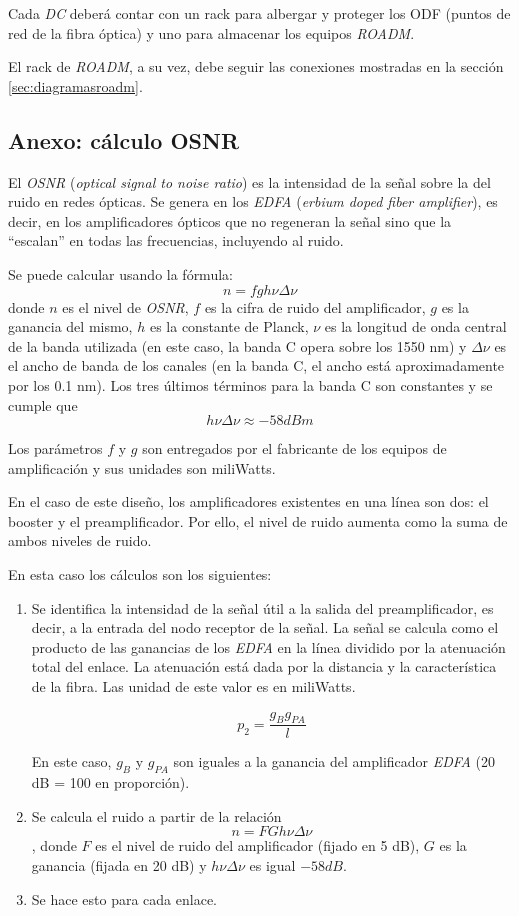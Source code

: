 Cada \emph{DC} deberá contar con un rack para albergar y proteger los
ODF (puntos de red de la fibra óptica) y uno para almacenar los
equipos \emph{ROADM}.

El rack de \emph{ROADM}, a su vez, debe seguir las conexiones
mostradas en la sección \ref{sec:diagramasroadm}.

\subsection{Anexo: cálculo OSNR}
\label{sec:osnr}

El \emph{OSNR} (\emph{optical signal to noise ratio}) es la intensidad
de la señal sobre la del ruido en redes ópticas. Se genera en los
\emph{EDFA} (\emph{erbium doped fiber amplifier}), es decir, en los
amplificadores ópticos que no regeneran la señal sino que la
``escalan'' en todas las frecuencias, incluyendo al ruido.

Se puede calcular usando la fórmula: $$n = fgh \nu \Delta \nu$$ donde
$n$ es el nivel de \emph{OSNR}, $f$ es la cifra de ruido del
amplificador, $g$ es la ganancia del mismo, $h$ es la constante de
Planck, $\nu$ es la longitud de onda central de la banda utilizada (en
este caso, la banda C opera sobre los 1550 nm) y $\Delta \nu$ es el
ancho de banda de los canales (en la banda C, el ancho está
aproximadamente por los 0.1 nm). Los tres últimos términos para la
banda C son constantes y se cumple que $$h\nu \Delta \nu \approx -58
dBm$$

Los parámetros $f$ y $g$ son entregados por el fabricante de los
equipos de amplificación y sus unidades son miliWatts.

En el caso de este diseño, los amplificadores existentes en una línea
son dos: el booster y el preamplificador. Por ello, el nivel de ruido
aumenta como la suma de ambos niveles de ruido.

En esta caso los cálculos son los siguientes:
\begin{enumerate}
\item Se identifica la intensidad de la señal útil a la salida del
  preamplificador, es decir, a la entrada del nodo receptor de la
  señal. La señal se calcula como el producto de las ganancias de los
  \emph{EDFA} en la línea dividido por la atenuación total del
  enlace. La atenuación está dada por la distancia y la característica
  de la fibra. Las unidad de este valor es en miliWatts.

  $$p_2=\frac{g_Bg_{PA}}{l}$$

  En este caso, $g_B$ y $g_{PA}$ son iguales a la ganancia del
  amplificador \emph{EDFA} (20 dB = 100 en proporción).
\item Se calcula el ruido a partir de la relación $$n=FGh \nu \Delta
  \nu$$, donde $F$ es el nivel de ruido del amplificador (fijado en 5
  dB), $G$ es la ganancia (fijada en 20 dB) y $h \nu \Delta \nu$ es
  igual $-58dB$.
\item Se hace esto para cada enlace.
\end{enumerate}

